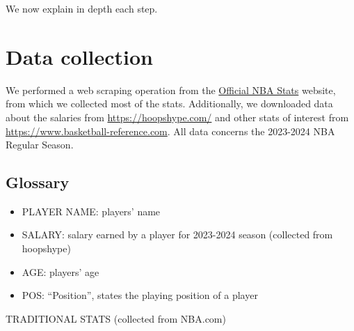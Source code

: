 \documentclass[
]{article}
\providecommand{\tightlist}{%
  \setlength{\itemsep}{0pt}\setlength{\parskip}{0pt}}
\begin{document}
We now explain in depth each step.

\hfill\break

\hypertarget{data-collection}{%
\section{Data collection}\label{data-collection}}

We performed a web scraping operation from the
\href{https://www.nba.com/stats}{Official NBA Stats} website, from which
we collected most of the stats. Additionally, we downloaded data about
the salaries from \url{https://hoopshype.com/} and other stats of
interest from \url{https://www.basketball-reference.com}. All data
concerns the 2023-2024 NBA Regular Season.

\hypertarget{glossary}{%
\subsection{Glossary}\label{glossary}}

\begin{itemize}
\tightlist
\item
  PLAYER NAME: players' name
\item
  SALARY: salary earned by a player for 2023-2024 season (collected from
  hoopshype)
\item
  AGE: players' age
\item
  POS: ``Position'', states the playing position of a player
\end{itemize}

TRADITIONAL STATS (collected from NBA.com)
\end{document}
